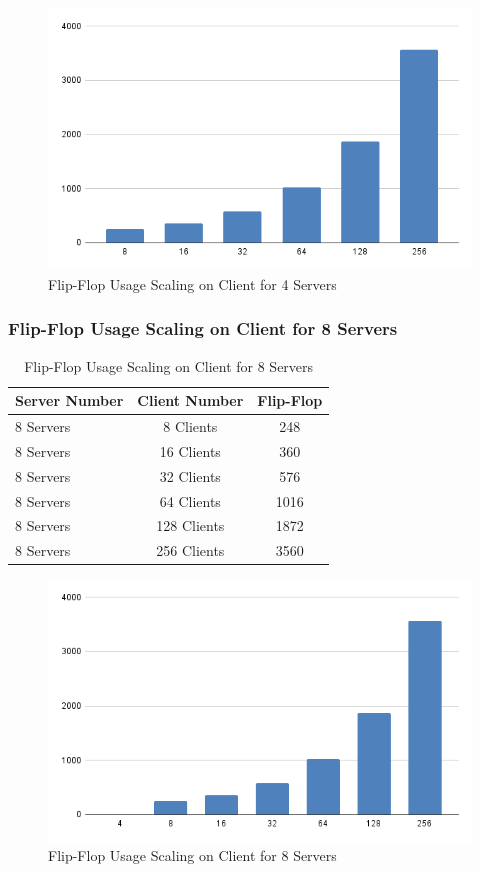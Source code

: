  \begin{figure}[htb]
	\centering
	\includegraphics[width=.9\linewidth]{figures/Scaling/FF_4Server.png}
	\caption{Flip-Flop Usage Scaling on Client for 4 Servers}
	\label{fig:ffs4}
\end{figure}

\newpage


\subsubsection{Flip-Flop Usage Scaling on Client for 8 Servers}

\begin{table}[htb]
	\centering
	\caption{Flip-Flop Usage Scaling on Client for 8 Servers}
	\begin{tabular}{l c c}
		\toprule
		Server Number  & Client Number  & Flip-Flop\\ \midrule
        8	Servers	&	8	Clients	&	248	\\
        8	Servers	&	16	Clients	&	360	\\
        8	Servers	&	32	Clients	&	576	\\
        8	Servers	&	64	Clients	&	1016	\\
        8	Servers	&	128	Clients	&	1872	\\
        8	Servers	&	256	Clients	&	3560	\\
		\bottomrule
	\end{tabular}
	\label{tab:FF-8Server}
\end{table}

 \begin{figure}[h]
	\centering
	\includegraphics[width=.9\linewidth]{figures/Scaling/FF-8Server.png}
	\caption{Flip-Flop Usage Scaling on Client for 8 Servers}
	\label{fig:ffs8}
\end{figure}

